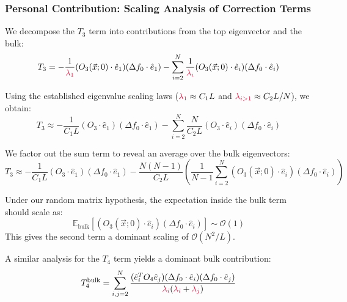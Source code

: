 \documentclass[a4paper]{article}
\theoremstyle{plain}
\theoremstyle{definition}
\theoremstyle{remark}
\begin{document}
\subsubsection{Personal Contribution: Scaling Analysis of Correction Terms}
We decompose the $T_3$ term into contributions from the top eigenvector and the bulk:
\begin{equation}
T_3 = -\frac{1}{\textcolor{kernelcolor}{\lambda_{1}}}(O_{3}(\vec{x};0)\cdot\hat{e}_{1})(\Delta f_{0}\cdot\hat{e}_{1}) - \sum_{i=2}^N\frac{1}{\textcolor{kernelcolor}{\lambda_{i}}}(O_{3}(\vec{x};0)\cdot\hat{e}_{i})(\Delta f_{0}\cdot\hat{e}_{i})
\end{equation}

Using the established eigenvalue scaling laws ($\textcolor{kernelcolor}{\lambda_1} \approx C_1 L$ and $\textcolor{kernelcolor}{\lambda_{i>1}} \approx C_2 L/N$), we obtain:
\begin{equation}
T_3 \approx -\frac{1}{C_1 L}(O_{3}\cdot\hat{e}_{1})(\Delta f_{0}\cdot\hat{e}_{1}) - \sum_{i=2}^N\frac{N}{C_2 L}(O_{3}\cdot\hat{e}_{i})(\Delta f_{0}\cdot\hat{e}_{i})
\end{equation}

We factor out the sum term to reveal an average over the bulk eigenvectors:
\begin{equation}
T_3 \approx -\frac{1}{C_1 L}(O_{3}\cdot\hat{e}_{1})(\Delta f_{0}\cdot\hat{e}_{1}) - \frac{N(N-1)}{C_2 L} \left( \frac{1}{N-1} \sum_{i=2}^N (O_{3}(\vec{x};0)\cdot\hat{e}_{i})(\Delta f_{0}\cdot\hat{e}_{i}) \right)
\end{equation}

\begin{tcolorbox}[colback=green!10,colframe=green!60!black,title={\textbf{Expectation Scaling for $T_3$ Bulk Term}},enhanced,drop shadow]
Under our random matrix hypothesis, the expectation inside the bulk term should scale as:
\begin{equation}
\mathbb{E}_{\text{bulk}} \left[ (O_{3}(\vec{x};0)\cdot\hat{e}_{i})(\Delta f_{0}\cdot\hat{e}_{i}) \right] \sim \mathcal{O}(1)
\end{equation}
This gives the second term a dominant scaling of $\mathcal{O}(N^2/L)$.
\end{tcolorbox}

A similar analysis for the $T_4$ term yields a dominant bulk contribution:
\begin{equation}
T_4^{\text{bulk}} = \sum_{i,j=2}^N \frac{(\hat{e}_{i}^{T}O_{4}\hat{e}_{j})(\Delta f_{0}\cdot \hat{e}_{i})(\Delta f_{0}\cdot \hat{e}_{j})}{\textcolor{kernelcolor}{\lambda_i}(\textcolor{kernelcolor}{\lambda_i}+\textcolor{kernelcolor}{\lambda_j})}
\end{equation}
\end{document}
